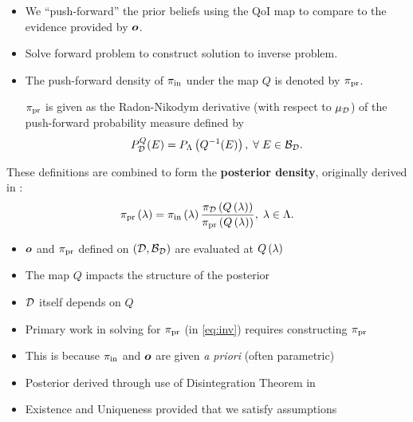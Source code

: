 \begin{frame}[t]
\begin{itemize}
	\item We ``push-forward'' the prior beliefs using the QoI map to compare to the evidence provided by $\operatorname*{\boldsymbol{o}}$.
	\item Solve forward problem to construct solution to inverse problem.
	\item The push-forward density of $\operatorname*{\pi_{in}}$ under the map $Q$ is denoted by $\operatorname*{\pi_{pr}}$.
	\begin{defn}\label{defn:pfprior}
$\operatorname*{\pi_{pr}}$ is given as the Radon-Nikodym derivative (with respect to $\mu_{\mathcal{D}}$) of the push-forward probability measure defined by
\begin{equation}\label{eq:pfpr}
P_{\mathcal{D}}^Q (E)  = P_{\Lambda} \left ( Q^{-1}(E) \right ), \; \forall \; E \in \mathcal{B}_{\mathcal{D}}.
\end{equation}
\end{defn}

\end{itemize}

\end{frame}

\begin{frame}[t]
These definitions are combined to form the \textbf{posterior density}, originally derived in \cite{BJW18}:
\begin{equation}\label{eq:post}
\operatorname*{\pi_{pr}} \left ( \lambda \right ) = \operatorname*{\pi_{in}} \left ( \lambda \right ) \frac{\pi_{\mathcal{D}} \left ( Q\left ( \lambda \right ) \right ) }{\operatorname*{\pi_{pr}} \left ( Q\left ( \lambda \right ) \right ) }, \; \lambda \in {\Lambda}.
\end{equation}

\begin{itemize}
	\item $\operatorname*{\boldsymbol{o}}$ and $\operatorname*{\pi_{pr}}$ defined on $(\mathcal{D}, \mathcal{B}_{\mathcal{D}})$ are evaluated at $Q\left ( \lambda \right )$
	\item The map $Q$ impacts the structure of the posterior
	\item $\mathcal{D}$ itself depends on $Q$
	\item Primary work in solving for $\operatorname*{\pi_{pr}}$ (in \eqref{eq:inv}) requires constructing $\operatorname*{\pi_{pr}}$
	\item This is because $\operatorname*{\pi_{in}}$ and $\operatorname*{\boldsymbol{o}}$ are given \emph{a priori} (often parametric)
	\item Posterior derived through use of Disintegration Theorem in \cite{BJW18}
	\item Existence and Uniqueness provided that we satisfy assumptions
\end{itemize}
\end{frame}



